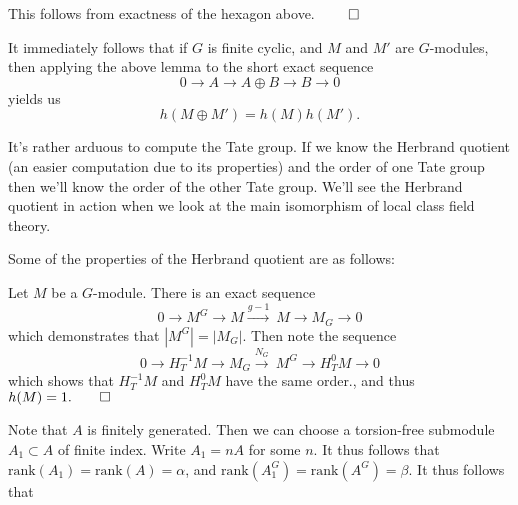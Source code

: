 \documentclass[a4paper, 12pt,oneside,openany]{book}
\begin{document}

 This follows from exactness of the hexagon above. $\qed$

It immediately follows that if $G$ is finite cyclic, and $M$ and $M'$ are $G$-modules, then applying the above lemma to the short exact sequence $$0\to A \to A\oplus B \to B \to 0$$ yields us $$h(M \oplus M') = h(M)h(M').$$ 

It's rather arduous to compute the Tate group. If we know the Herbrand quotient (an easier computation due to its properties) and the order of one Tate group then we'll know the order of the other Tate group. We'll see the Herbrand quotient in action when we look at the main isomorphism of local class field theory.

Some of the properties of the Herbrand quotient are as follows:


 Let $M$ be a $G$-module. There is an exact sequence $$0 \to M^G \to M \xrightarrow{g-1}\ M \to M_G \to 0$$ which demonstrates that $|M^G| = |M_G|$. Then note the sequence $$0 \to H_T^{-1}M \to M_G \xrightarrow{N_G}\ M^G \to H_T^0 M\to 0$$ which shows that $H_T^{-1} M$ and $H_T^0 M$ have the same order., and thus $h(M)=1. \qed$





 Note that $A$ is finitely generated. Then we can choose a torsion-free submodule $A_1 \subset A$ of finite index. Write $A_1=nA$ for some $n$. It thus follows that $\text{rank}(A_1)=\text{rank}(A)=\alpha$, and $\text{rank}(A_1^G)=\text{rank}(A^G)=\beta$. It thus follows that 
\end{document}
